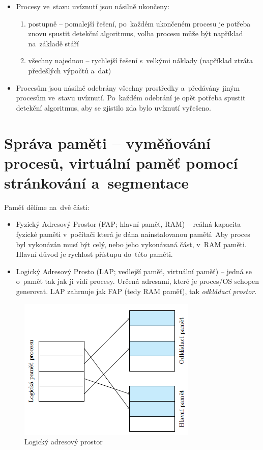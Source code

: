 \begin{itemize}
	\item Procesy ve~stavu uvíznutí jsou násilně ukončeny:
	\begin{enumerate}
		\item postupně -- pomalejší řešení, po~každém ukončeném procesu je potřeba znovu spustit detekční algoritmus, volba procesu může být například na~základě stáří
		\item všechny najednou -- rychlejší řešení s~velkými náklady (například ztráta předešlých výpočtů a~dat)
	\end{enumerate}
	
	\item Procesům jsou násilně odebrány všechny prostředky a~předávány jiným procesům ve~stavu uvíznutí. Po~každém odebrání je opět potřeba spustit detekční algoritmus, aby se zjistilo zda bylo uvíznutí vyřešeno.
\end{itemize}


\clearpage
\section{Správa paměti -- vyměňování procesů, virtuální paměť pomocí stránkování a~segmentace}

Paměť dělíme na~dvě části:
\begin{itemize}
	\item Fyzický Adresový Prostor (FAP; hlavní paměť, RAM) -- reálná kapacita fyzické paměti v~počítači která je dána nainstalovanou pamětí. Aby proces byl vykonáván musí být celý, nebo jeho vykonávaná část, v~RAM paměti. Hlavní důvod je rychlost přístupu do~této paměti.
	\item Logický Adresový Prosto (LAP; vedlejší paměť, virtuální paměť) -- jedná se o~paměť tak jak ji vidí procesy. Určená adresami, které je proces/OS schopen generovat. LAP zahrnuje jak FAP (tedy RAM paměť), tak \emph{odkládací prostor}.
\end{itemize}

\begin{figure}[ht]
	\centering
	\includegraphics[scale=1]{images/mem_lap.png}
	\caption{Logický adresový prostor}
	\label{mem_lap}
\end{figure}

